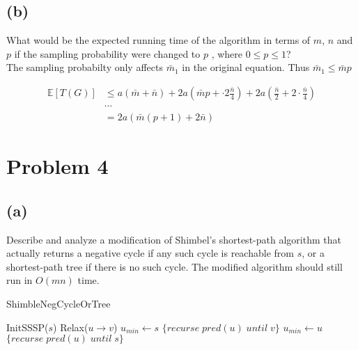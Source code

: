 \documentclass[12pt]{article}
\begin{document}
\subsection*{(b)}
What would be the expected running time of the algorithm in terms of
$m$, $n$ and $p$ if the sampling probability were changed to $p$ ,
where $0 \le p \le 1$?\\

The sampling probabilty only affects $\bar{m}_1$ in the original equation.
Thus $\bar{m}_1 \le \bar{m}p$

\begin{align*}
    \mathbb{E}[T(G)] &\le a(\bar{m} + \bar{n}) + 2a\left(\bar{m}p
                      + \cdot2\frac{\bar{n}}{4}\right)
                      + 2a\left(\frac{\bar{n}}{2} + 2\cdot\frac{\bar{n}}{4}\right)\\
                     & \cdots \\
                     &= 2a(\bar{m}(p + 1) + 2\bar{n})
\end{align*}


\pagebreak

\section*{Problem 4}

\subsection*{(a)}
Describe and analyze a modification of Shimbel's shortest-path algorithm
that actually returns a negative cycle if any such cycle is reachable
from $s$, or a shortest-path tree if there is no such cycle. The modified
algorithm should still run in $O(mn)$ time.

\begin{algorithm}
\caption{ShimbleNegCycleOrTree}
\begin{algorithmic}
    \STATE InitSSSP($s$)
                \STATE Relax($u \rightarrow v$)
            \ENDIF
        \ENDFOR
    \ENDFOR
    \STATE $u_{min} \leftarrow s$
            \RETURN $\{ recurse\; pred(u)\; until\; v \}$
        \ENDIF
            \STATE $u_{min} \leftarrow u$
        \ENDIF
        \RETURN $\{ recurse\; pred(u)\; until\; s \}$
    \ENDFOR
\end{algorithmic}
\end{algorithm}
\end{document}
